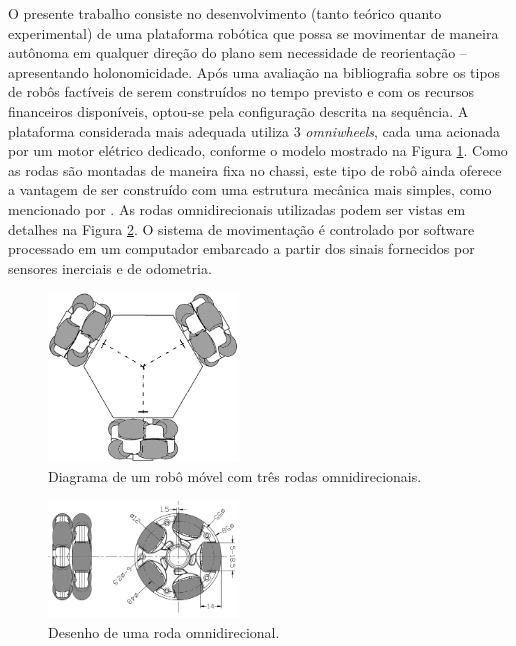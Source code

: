 
O presente trabalho consiste no desenvolvimento (tanto teórico quanto experimental) de uma plataforma robótica que possa se movimentar de maneira autônoma em qualquer direção do plano sem necessidade de reorientação -- apresentando holonomicidade. Após uma avaliação na bibliografia sobre os tipos de robôs factíveis de serem construídos no tempo previsto e com os recursos financeiros disponíveis, optou-se pela configuração descrita na sequência. A plataforma considerada mais adequada utiliza 3 \emph{omniwheels}, cada uma acionada por um motor elétrico dedicado, conforme o modelo mostrado na Figura \ref{fig:tomr_ritter}. Como as rodas são montadas de maneira fixa no chassi, este tipo de robô ainda oferece a vantagem de ser construído com uma estrutura mecânica mais simples, como mencionado por \citet{siciliano2016springer}. As rodas omnidirecionais utilizadas podem ser vistas em detalhes na Figura \ref{fig:omniwheel}. O sistema de movimentação é controlado por software processado em um computador embarcado a partir dos sinais fornecidos por sensores inerciais e de odometria.

\begin{figure}[h]
  \centering
  \includegraphics[width = 0.45\textwidth]{imagens/tomr_ritter_mod}
  \caption{Diagrama de um robô móvel com três rodas omnidirecionais.}
  \label{fig:tomr_ritter}
\end{figure}

\begin{figure}[h]
  \centering
  \includegraphics[width = 0.45\textwidth]{imagens/omniwheel}
  \caption{Desenho de uma roda omnidirecional.}
  \label{fig:omniwheel}
\end{figure}

